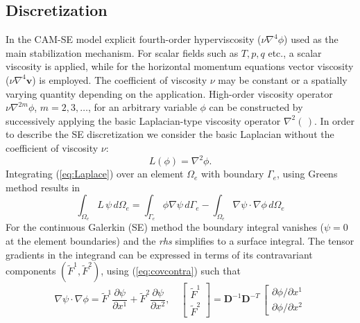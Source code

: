 \documentclass{agujournal}
\begin{document}
{   \subsection{Discretization}
   In the CAM-SE model explicit  fourth-order hyperviscosity  ($\nu \nabla^4 \phi$) used as 
    the main stabilization mechanism.  For scalar fields such as $T, p, q$ etc., 
   a scalar viscosity   is applied,  while  for the horizontal momentum equations vector viscosity
   ($\nu \nabla^4 \mathbf{v} $) is employed. The coefficient of viscosity $\nu$ may be constant or a spatially varying 
  quantity  depending on the application. High-order viscosity operator $ \nu \nabla^{2m} \phi$, $m=2,3, \dots$, 
    for an arbitrary variable $\phi$  can be constructed 
  by successively applying the basic Laplacian-type viscosity operator $\nabla^2 ( \,)$. In order to describe the SE discretization 
  we consider the basic Laplacian without the coefficient of viscosity $\nu$: 
   \begin{equation}
   L(\phi)  = \nabla^2 \phi .  \label{eq:Laplace}
   \end{equation}
  Integrating  (\ref{eq:Laplace}) over an element $\Omega_e$  with boundary $\Gamma_e$, using Greens method   results in 
    \begin{equation}
  \int_{\Omega_e}  L \, \psi  \,  d \Omega_e  =   \int_{\Gamma_e}  \phi \nabla \psi  \,    d  \Gamma_e - 
                      \int_{\Omega_e}  \nabla \psi \cdot \nabla \phi \,  d \Omega_e  \label{eq:Lweak}
   \end{equation}
   For the continuous Galerkin (SE) method the boundary integral vanishes ($\psi = 0$ at the element boundaries) 
   and the  {\em  rhs} simplifies to 
   a surface integral.   The tensor gradients in the integrand  can be expressed  in terms of its contravariant  components 
   $(\tilde{F}^1, \tilde{F}^2)$, using (\ref{eq:covcontra}) such that 
 \begin{equation}
    \nabla \psi \cdot \nabla \phi  = \tilde{F}^1  \frac{\partial \psi}{ \partial x^1} +
      \tilde{F}^2  \frac{\partial \psi}{ \partial x^2} , \quad 
     \left[   \begin{array}{c}
               \tilde{F}^1  \\     \tilde{F}^2
             \end{array}
           \right]
           =
     \mathbf{D}^{-1}  \mathbf{D}^{-T}   \, \left[   \begin{array}{c}
                \partial \phi / \partial x^1  \\ \partial \phi / \partial x^2 

\end{array}
\end{equation}}
\end{document}
